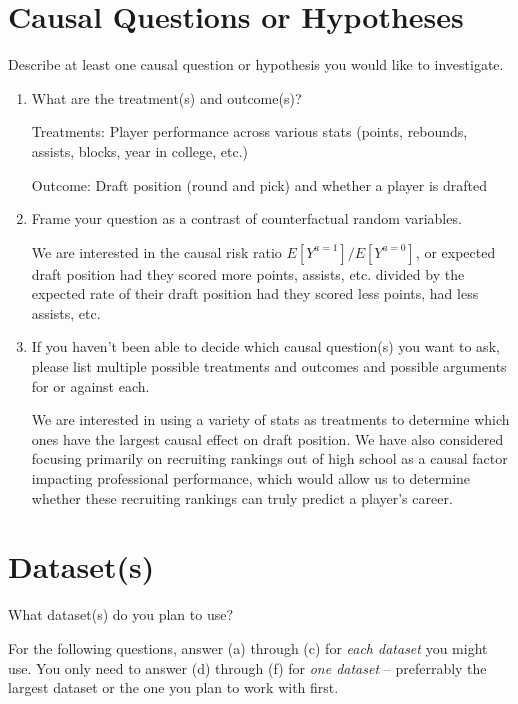 \documentclass[12pt]{article}
\begin{document}
\section{Causal Questions or Hypotheses}

\noindent Describe at least one causal question or hypothesis you would like to investigate. 
\begin{enumerate}[itemsep=0em,label={(\alph*)}]
\item What are the treatment(s) and outcome(s)?

Treatments: Player performance across various stats (points, rebounds, assists, blocks, year in college, etc.)

Outcome: Draft position (round and pick) and whether a player is drafted

\item Frame your question as a contrast of counterfactual random variables.

We are interested in the causal risk ratio $E[Y^{a=1}] / E[Y^{a=0}]$, or expected draft position  had they scored more points, assists, etc. divided by the expected rate of their draft position had they scored less points, had less assists, etc. 

\item If you haven't been able to decide which causal question(s) you want to ask, please list multiple possible treatments and outcomes and possible arguments for or against each.

We are interested in using a variety of stats as treatments to determine which ones have the largest causal effect on draft position. We have also considered focusing primarily on recruiting rankings out of high school as a causal factor impacting professional performance, which would allow us to determine whether these recruiting rankings can truly predict a player's career.

\end{enumerate}

\section{Dataset(s)}

\noindent What dataset(s) do you plan to use?

For the following questions, answer (a) through (c) for \emph{each dataset} you might use. You only need to answer (d) through (f) for \emph{one dataset} -- preferrably the largest dataset or the one you plan to work with first.
\end{document}

